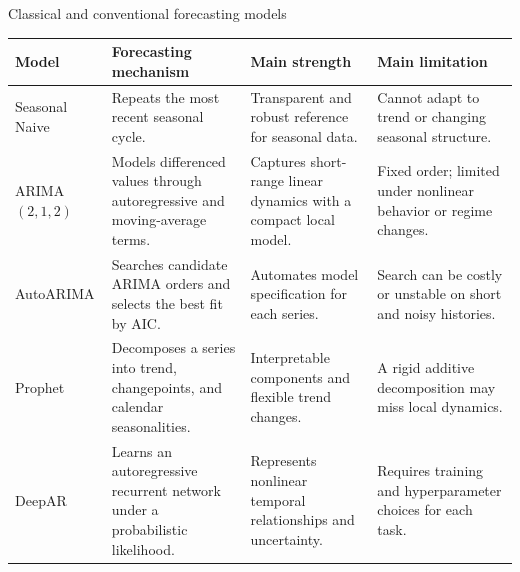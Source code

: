 \documentclass[aspectratio=169,10pt]{beamer}
\begin{document}
\begin{frame}{Classical and conventional forecasting models}
  \vspace{0.12cm}
  \fontsize{8.2}{9.5}\selectfont
  \renewcommand{\arraystretch}{1.33}
  \setlength{\tabcolsep}{3.0pt}
  \begin{tabularx}{\linewidth}{L{1.75cm} Y L{3.20cm} L{3.20cm}}
    \toprule
    \textbf{Model} & \textbf{Forecasting mechanism} &
      \textbf{Main strength} & \textbf{Main limitation} \\
    \midrule
    Seasonal Naive & Repeats the most recent seasonal cycle. &
      Transparent and robust reference for seasonal data. &
      Cannot adapt to trend or changing seasonal structure. \\
    ARIMA $(2,1,2)$ & Models differenced values through autoregressive and
      moving-average terms. & Captures short-range linear dynamics with a
      compact local model. & Fixed order; limited under nonlinear behavior or
      regime changes. \\
    AutoARIMA & Searches candidate ARIMA orders and selects the best fit by AIC. &
      Automates model specification for each series. & Search can be costly or
      unstable on short and noisy histories. \\
    Prophet & Decomposes a series into trend, changepoints, and calendar
      seasonalities. & Interpretable components and flexible trend changes. &
      A rigid additive decomposition may miss local dynamics. \\
    DeepAR & Learns an autoregressive recurrent network under a probabilistic
      likelihood. & Represents nonlinear temporal relationships and uncertainty. &
      Requires training and hyperparameter choices for each task. \\
    \bottomrule
  \end{tabularx}
\end{frame}
\end{document}
